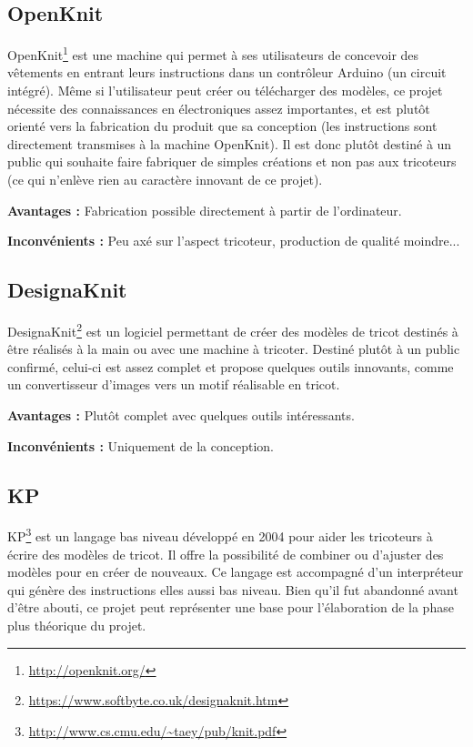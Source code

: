 \documentclass{article}
\begin{document}
\subsection{OpenKnit}

OpenKnit\footnote{\url{http://openknit.org/}} est une machine qui permet à ses utilisateurs de concevoir des vêtements en entrant leurs 
instructions dans un contrôleur Arduino (un circuit intégré). Même si l'utilisateur peut créer ou télécharger des modèles, ce projet 
nécessite des connaissances en électroniques assez importantes, et est plutôt orienté vers la fabrication du produit que sa conception 
(les instructions sont directement transmises à la machine OpenKnit). Il est donc plutôt destiné à un public qui souhaite faire fabriquer 
de simples créations et non pas aux tricoteurs (ce qui n'enlève rien au caractère innovant de ce projet).

\textbf{Avantages : } Fabrication possible directement à partir de l'ordinateur.

\textbf{Inconvénients : } Peu axé sur l'aspect tricoteur, production de qualité moindre...

\subsection{DesignaKnit}

DesignaKnit\footnote{\url{https://www.softbyte.co.uk/designaknit.htm}} est un logiciel permettant de créer des modèles de tricot destinés 
à être réalisés à la main ou avec une machine à tricoter. Destiné plutôt à un public confirmé, celui-ci est assez complet et propose 
quelques outils innovants, comme un convertisseur d'images vers un motif réalisable en tricot.

\textbf{Avantages : } Plutôt complet avec quelques outils intéressants.

\textbf{Inconvénients : } Uniquement de la conception.

\subsection{KP}

KP\footnote{\url{http://www.cs.cmu.edu/~taey/pub/knit.pdf}} est un langage bas niveau développé en 2004 pour aider les tricoteurs à écrire 
des modèles de tricot. Il offre la possibilité de combiner ou d'ajuster des modèles pour en créer de nouveaux. Ce langage est accompagné 
d'un interpréteur qui génère des instructions elles aussi bas niveau. Bien qu'il fut abandonné avant d'être abouti, ce projet peut 
représenter une base pour l'élaboration de la phase plus théorique du projet.
\end{document}
